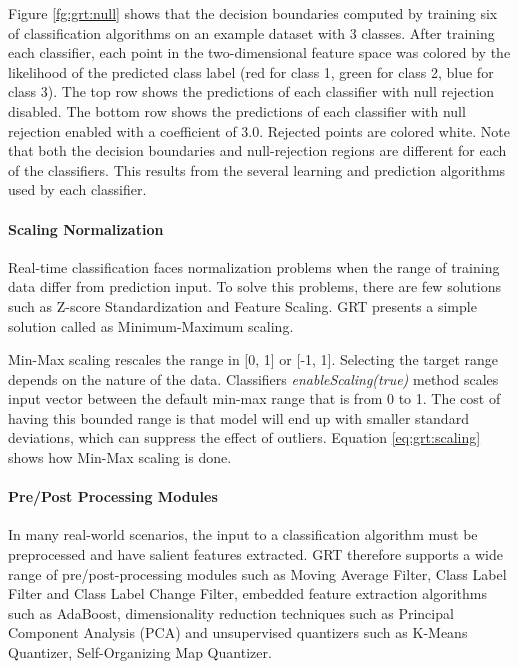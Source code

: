 Figure \ref{fg:grt:null} shows that the decision boundaries computed by training six of classification algorithms on an example dataset with 3 classes. After training each classifier, each point in the two-dimensional feature space was colored by the likelihood of the predicted class label (red for class 1, green for class 2, blue for class 3). The top row shows the predictions of each classifier with null rejection disabled. The bottom row shows the predictions of each classifier with null rejection enabled with a coefficient of 3.0. Rejected points are colored white. Note that both the decision boundaries and null-rejection regions are different for each of the classifiers. This results from the several learning and prediction algorithms used by each classifier. 

\paragraph*{Scaling Normalization} Real-time classification faces normalization problems when the range of training data differ from prediction input. To solve this problems, there are few solutions such as Z-score Standardization and Feature Scaling. GRT presents a simple solution called as Minimum-Maximum scaling.

Min-Max scaling rescales the range in [0, 1] or [-1, 1]. Selecting the target range depends on the nature of the data. Classifiers \textit{enableScaling(true)} method scales input vector between the default min-max range that is from 0 to 1. The cost of having this bounded range is that model will end up with smaller standard deviations, which can suppress the effect of outliers. Equation \ref{eq:grt:scaling} shows how Min-Max scaling is done.



\paragraph*{Pre/Post Processing Modules} In many real-world scenarios, the input to a classification algorithm must be preprocessed and have salient features extracted. GRT therefore supports a wide range of pre/post-processing modules such as Moving Average Filter, Class Label Filter and Class Label Change Filter, embedded feature extraction algorithms such as AdaBoost, dimensionality reduction techniques such as Principal Component Analysis (PCA) and unsupervised quantizers such as K-Means Quantizer, Self-Organizing Map Quantizer.

